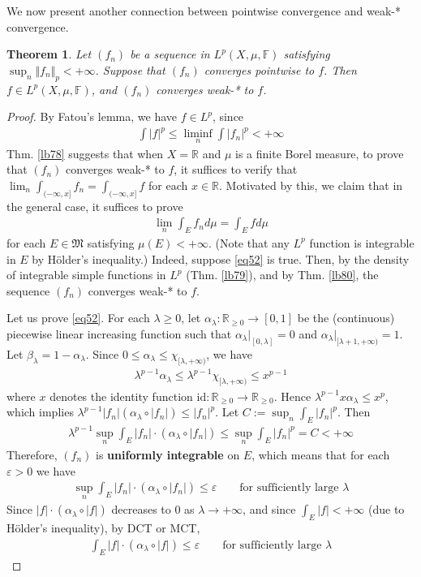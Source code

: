 \documentclass[12pt,b5paper,notitlepage]{article}
\theoremstyle{definition}
\theoremstyle{plain}
\newtheorem{thm}[df]{Theorem}
\newcommand{\fk}{\mathfrak}
\newcommand{\id}{\mathrm{id}}
\newcommand{\Rbb}{\mathbb R}
\newcommand{\Fbb}{\mathbb F}
\newcommand{\eps}{\varepsilon}
\numberwithin{equation}{section}
\begin{document}
We now present another connection between pointwise convergence and weak-* convergence.


\begin{thm}\label{lb81}
Let $(f_n)$ be a sequence in $L^p(X,\mu,\Fbb)$ satisfying $\sup_n\Vert f_n\Vert_p<+\infty$. Suppose that $(f_n)$ converges pointwise to $f$. Then $f\in L^p(X,\mu,\Fbb)$, and $(f_n)$ converges weak-* to $f$.
\end{thm}


\begin{proof}
By Fatou's lemma, we have $f\in L^p$, since
\begin{align*}
\int |f|^p\leq\liminf_n\int |f_n|^p<+\infty
\end{align*}
Thm. \ref{lb78} suggests that when $X=\Rbb$ and $\mu$ is a finite Borel measure, to prove that $(f_n)$ converges weak-* to $f$, it suffices to verify that $\lim_n \int_{(-\infty,x]}f_n=\int_{(-\infty,x]}f$ for each $x\in\Rbb$. Motivated by this, we claim that in the general case, it suffices to prove
\begin{align}\label{eq52}
\lim_n \int_E f_nd\mu=\int_E fd\mu
\end{align}
for each $E\in\fk M$ satisfying $\mu(E)<+\infty$. (Note that any $L^p$ function is integrable in $E$ by H\"older's inequality.) Indeed, suppose \eqref{eq52} is true. Then, by the density of integrable simple functions in $L^p$ (Thm. \ref{lb79}), and by Thm. \ref{lb80}, the sequence $(f_n)$ converges weak-* to $f$.

Let us prove \eqref{eq52}. For each $\lambda\geq0$, let $\alpha_\lambda:\Rbb_{\geq0}\rightarrow[0,1]$ be the (continuous) piecewise linear increasing function such that $\alpha_\lambda|_{[0,\lambda]}=0$ and $\alpha_\lambda|_{[\lambda+1,+\infty)}=1$. Let $\beta_\lambda=1-\alpha_\lambda$. Since $0\leq\alpha_\lambda\leq\chi_{[\lambda,+\infty)}$, we have
\begin{align*}
\lambda^{p-1}\alpha_\lambda\leq\lambda^{p-1}\chi_{[\lambda,+\infty)}\leq x^{p-1}
\end{align*}
where $x$ denotes the identity function $\id:\Rbb_{\geq0}\rightarrow\Rbb_{\geq0}$. Hence $\lambda^{p-1}x\alpha_\lambda\leq x^p$, which implies $\lambda^{p-1}|f_n|(\alpha_\lambda\circ|f_n|)\leq|f_n|^p$. Let $C:=\sup_n\int_E|f_n|^p$. Then
\begin{align*}
\lambda^{p-1}\sup_n\int_E |f_n|\cdot(\alpha_\lambda\circ|f_n|)\leq \sup_n\int_E|f_n|^p=C<+\infty
\end{align*}
Therefore, $(f_n)$ is \textbf{uniformly integrable} on $E$, which means that for each $\eps>0$ we have
\begin{align*}
\sup_n\int_E |f_n|\cdot(\alpha_\lambda\circ|f_n|)\leq\eps\qquad\text{for sufficiently large }\lambda
\end{align*}
Since $|f|\cdot(\alpha_\lambda\circ|f|)$ decreases to $0$ as $\lambda\rightarrow+\infty$, and since $\int_E|f|<+\infty$ (due to H\"older's inequality), by DCT or MCT, 
\begin{align*}
\int_E |f|\cdot(\alpha_\lambda\circ|f|)\leq\eps\qquad\text{for sufficiently large }\lambda
\end{align*}


\end{proof}
\end{document}
